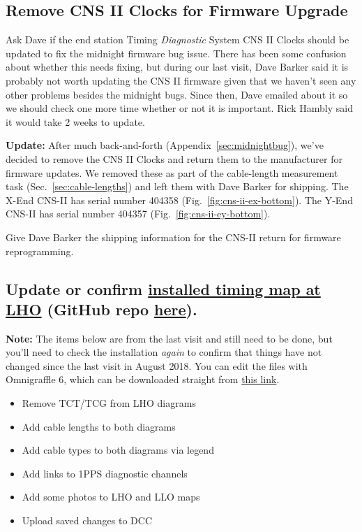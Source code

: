 \documentclass{article}
\newcommand*{\TODO}{\textcolor{todo}}
\begin{document}
\TODO{\subsection{Remove CNS II Clocks for Firmware Upgrade}}

Ask Dave if the end station Timing \textit{Diagnostic} System CNS II Clocks should be updated to fix the midnight firmware bug issue. There has been some confusion about whether this needs fixing, but during our last visit, Dave Barker said it is probably not worth updating the CNS II firmware given that we haven't seen any other problems besides the midnight bugs. Since then, Dave emailed about it so we should check one more time whether or not it is important. Rick Hambly said it would take 2 weeks to update. 

\textbf{Update:} After much back-and-forth (Appendix~\ref{sec:midnightbug}), we've decided to remove the CNS II Clocks and return them to the manufacturer for firmware updates. We removed these as part of the cable-length measurement task (Sec.~\ref{sec:cable-lengths}) and left them with Dave Barker for shipping. The X-End CNS-II has serial number 404358 (Fig.~\ref{fig:cns-ii-ex-bottom}). The Y-End CNS-II has serial number 404357 (Fig.~\ref{fig:cns-ii-ey-bottom}).

\TODO{Give Dave Barker the shipping information for the CNS-II return for firmware reprogramming.}

\TODO{
\subsection{\label{sec:update-timing-diagram}
    Update or confirm
    \href{https://dcc.ligo.org/LIGO-D1500201}{installed timing map at LHO} (GitHub repo
    \href{https://github.com/stefco/geco_channels}{here}).
}
}
\textbf{Note:} The items below are from the last visit and still need to be done, but you'll need to check the installation \textit{again} to confirm that things have not changed since the last visit in August 2018. You can edit the files with Omnigraffle 6, which can be downloaded straight from \href{https://downloads.omnigroup.com/software/MacOSX/10.10/OmniGraffle-6.6.2.dmg}{this link}.

\begin{itemize}
  \item{Remove TCT/TCG from LHO diagrams}
  \item{Add cable lengths to both diagrams}
  \item{\TODO{Add cable types to both diagrams via legend}}
  \item{\TODO{Add links to 1PPS diagnostic channels}}
  \item{\TODO{Add some photos to LHO and LLO maps}}
  \item{\TODO{Upload saved changes to DCC}}
\end{itemize}
\end{document}
